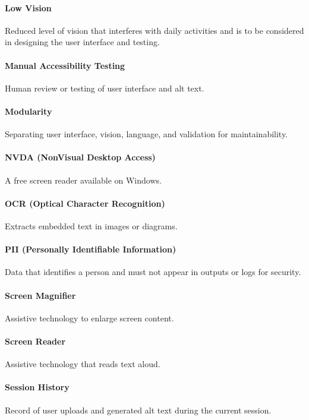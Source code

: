 \documentclass[12pt, titlepage]{article}
\begin{document}
\paragraph*{Low Vision}
Reduced level of vision that interferes with daily activities and is
to be considered in designing the user interface and testing.

\paragraph*{Manual Accessibility Testing}
Human review or testing of user interface and alt text.

\paragraph*{Modularity}
Separating user interface, vision, language, and validation for maintainability.

\paragraph*{NVDA (NonVisual Desktop Access)}
A free screen reader available on Windows.

\paragraph*{OCR (Optical Character Recognition)}
Extracts embedded text in images or diagrams.

\paragraph*{PII (Personally Identifiable Information)}
Data that identifies a person and must not appear in outputs or logs
for security.

\paragraph*{Screen Magnifier}
Assistive technology to enlarge screen content.

\paragraph*{Screen Reader}
Assistive technology that reads text aloud.

\paragraph*{Session History}
Record of user uploads and generated alt text during the current session.
\end{document}
